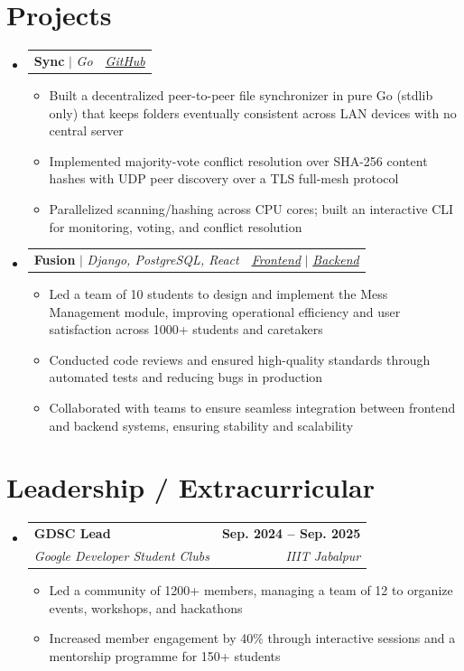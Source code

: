 \documentclass[a4paper,11pt]{article}
\makeatletter
\newcommand{\resumeItem}[1]{
  \item\small{
    {#1 \vspace{-2pt}}
  }
}
\newcommand{\resumeSubheading}[4]{
  \vspace{-2pt}\item
    \begin{tabular*}{1.0\textwidth}[t]{l@{\extracolsep{\fill}}r}
      \textbf{#1} & \textbf{\small #2} \\
      \textit{\small#3} & \textit{\small #4} \\
    \end{tabular*}\vspace{-7pt}
}
\newcommand{\resumeProjectHeading}[2]{
    \item
    \begin{tabular*}{1.001\textwidth}{l@{\extracolsep{\fill}}r}
      \small#1 & {#2}\\
    \end{tabular*}\vspace{-7pt}
}
\newcommand{\resumeSubHeadingListStart}{\begin{itemize}[leftmargin=0.0in, label={}]}
\newcommand{\resumeSubHeadingListEnd}{\end{itemize}}
\newcommand{\resumeItemListStart}{\begin{itemize}}
\newcommand{\resumeItemListEnd}{\end{itemize}\vspace{-5pt}}
\makeatother
\begin{document}
    \section{Projects}
        \resumeSubHeadingListStart
        \vspace{-6pt}
            \resumeProjectHeading
                {\textbf{Sync} $|$ \emph{Go}}{\href{https://github.com/adityakgupta/sync}{\textit{GitHub}}}
                    \resumeItemListStart
                        \resumeItem{Built a decentralized peer-to-peer file synchronizer in pure Go (stdlib only) that keeps folders eventually consistent across LAN devices with no central server}
                        \resumeItem{Implemented majority-vote conflict resolution over SHA-256 content hashes with UDP peer discovery over a TLS full-mesh protocol}
                        \resumeItem{Parallelized scanning/hashing across CPU cores; built an interactive CLI for monitoring, voting, and conflict resolution}
                    \resumeItemListEnd
        \vspace{-16pt}
            \resumeProjectHeading
                {\textbf{Fusion} $|$ \emph{Django, PostgreSQL, React}}{{\href{https://github.com/adityakgupta/Fusion-client/tree/sa-2}{\textit{Frontend}}} $|$ {\href{https://github.com/adityakgupta/Fusion/tree/sa-2}{\textit{Backend}}}}
                    \resumeItemListStart
                        \resumeItem{Led a team of 10 students to design and implement the Mess Management module, improving operational efficiency and user satisfaction across 1000+ students and caretakers}
                        \resumeItem{Conducted code reviews and ensured high-quality standards through automated tests and reducing bugs in production}
                        \resumeItem{Collaborated with teams to ensure seamless integration between frontend and backend systems, ensuring stability and scalability}
                    \resumeItemListEnd
        \resumeSubHeadingListEnd
        \vspace{-15pt}

    \section{Leadership / Extracurricular}
        \resumeSubHeadingListStart
            \resumeSubheading{GDSC Lead}{Sep. 2024 -- Sep. 2025}{Google Developer Student Clubs}{IIIT Jabalpur}
                \resumeItemListStart
                    \resumeItem{Led a community of 1200+ members, managing a team of 12 to organize events, workshops, and hackathons}
                    \resumeItem{Increased member engagement by 40\% through interactive sessions and a mentorship programme for 150+ students}
                \resumeItemListEnd
        \resumeSubHeadingListEnd
\end{document}
